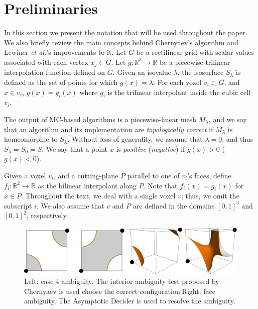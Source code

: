 
\section{Preliminaries}
\label{sec:preliminaries}

In this section we present the notation that will be used throughout the paper. We also briefly review the main concepts behind Chernyaev's algorithm and Lewiner \emph{et al.}'s improvements to it. 
%
Let $G$ be a rectilinear grid with scalar values associated with each vertex $x_j \in G$. Let $g:\mathbb{R}^3 \rightarrow \mathbb{R}$ be a piecewise-trilinear interpolation function defined on $G$. Given an isovalue $\lambda$,  the isosurface $S_\lambda$ is defined as the set of points for which $g(x)=\lambda$. For each voxel $v_i \subset G$, and $x \in v_i$, $g(x) = g_i(x)$ where $g_i$ is the trilinear interpolant inside the cubic cell $v_i$. 

The output of MC-based algorithms is a piecewise-linear mesh $M_\lambda$, and we say that an algorithm and its implementation are \emph{topologically correct} if $M_\lambda$ is homeomorphic to $S_\lambda$. Without loss of generality, we assume that $\lambda = 0$, and thus $S_\lambda = S_0 = S$. We say that a point $x$ is \emph{positive} (\emph{negative}) if $g(x) > 0$ ($g(x) < 0$). 

Given a voxel $v_i$, and a cutting-plane $P$ parallel to one of $v_i$'s faces, define  $f_i:\mathbb{R}^2 \rightarrow \mathbb{R}$ as the bilinear interpolant along $P$. Note that $f_i(x) = g_i(x)$ for $x \in P$. Throughout the text, we deal with a single voxel $v$; thus, we omit the subscript $i$. We also assume that $v$ and $P$ are defined in the domains  $[0,1]^3$ and $[0,1]^2$, respectively.

\begin{figure}[b]
     \centering
     \includegraphics[width=1\linewidth]{chapter4/figures/ambiguity.png}
     \caption{Left: case 4 ambiguity. The interior ambiguity test proposed by Chernyaev is used choose the correct configuration.Right: face ambiguity. The Asymptotic Decider  is used to resolve the ambiguity.}
     \label{ambiguity}
\end{figure}
 
